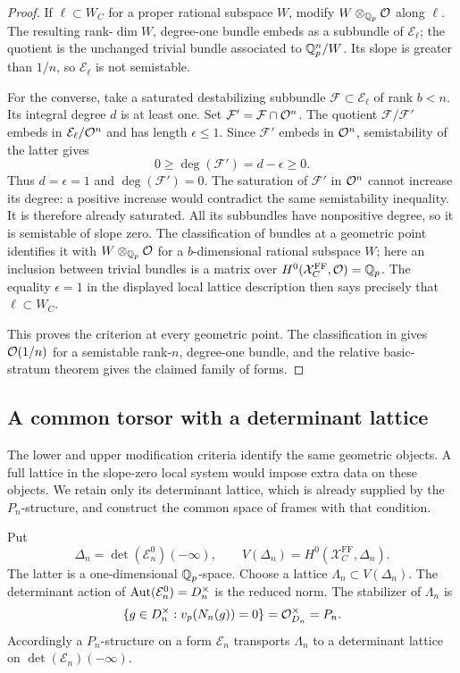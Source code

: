 \begin{proof}
If $\ell\subset W_C$ for a proper rational subspace $W$, modify
$W\otimes_{\mathbb Q_p}\mathcal O$ along $\ell$.  The resulting rank-$\dim W$,
degree-one bundle embeds as a subbundle of $\mathcal E_\ell$; the
quotient is the unchanged trivial bundle associated to $\mathbb Q_p^n/W$.
Its slope is greater than $1/n$, so $\mathcal E_\ell$ is not semistable.

For the converse, take a saturated destabilizing subbundle
$\mathcal F\subset\mathcal E_\ell$ of rank $b<n$.
Its integral degree $d$ is at least one.  Set
$\mathcal F'=\mathcal F\cap\mathcal O^n$.  The quotient
$\mathcal F/\mathcal F'$ embeds in $\mathcal E_\ell/\mathcal O^n$ and has
length $\epsilon\leq1$.  Since $\mathcal F'$ embeds in $\mathcal O^n$,
semistability of the latter gives
\[
 0\geq\deg(\mathcal F')=d-\epsilon\geq0.
\]
Thus $d=\epsilon=1$ and $\deg(\mathcal F')=0$.
The saturation of $\mathcal F'$ in $\mathcal O^n$ cannot increase its degree:
a positive increase would contradict the same semistability inequality.
It is therefore already saturated.  All its subbundles have
nonpositive degree, so it is semistable of slope zero.  The
classification of bundles at a geometric point identifies it with
$W\otimes_{\mathbb Q_p}\mathcal O$ for a $b$-dimensional rational subspace $W$;
here an inclusion between trivial bundles is a matrix over
$H^0(\mathcal X_C^{\mathrm{FF}},\mathcal O)=\mathbb Q_p$.
The equality $\epsilon=1$ in the displayed local lattice description
then says precisely that $\ell\subset W_C$.

This proves the criterion at every geometric point.  The classification
in \cite[Theorem II.2.14]{FS} gives $\mathcal O(1/n)$ for a semistable
rank-$n$, degree-one bundle, and the
relative basic-stratum theorem gives the claimed family of forms.
\end{proof}

\subsection{A common torsor with a determinant lattice}

The lower and upper modification criteria identify the same geometric
objects. A full lattice in the slope-zero local system would impose
extra data on these objects. We retain only its determinant lattice,
which is already supplied by the $P_n$-structure, and construct the
common space of frames with that condition.

Put
\[
 \Delta_n=\det(\mathcal E_n^0)(-\infty),\qquad
 V(\Delta_n)=H^0(\mathcal X_C^{\mathrm{FF}},\Delta_n).
\]
The latter is a one-dimensional $\mathbb Q_p$-space.  Choose a lattice
$\Lambda_n\subset V(\Delta_n)$.
The determinant action of
$\operatorname{Aut}(\mathcal E_n^0)=D_n^\times$ is the reduced norm.
The stabilizer of $\Lambda_n$ is
\[
 \{g\in D_n^\times:v_p(N_n(g))=0\}
       =\mathcal O_{D_n}^{\times}=P_n.
\]
Accordingly a $P_n$-structure on a form $\mathcal E_n$ transports
$\Lambda_n$ to a determinant lattice on
$\det(\mathcal E_n)(-\infty)$.

